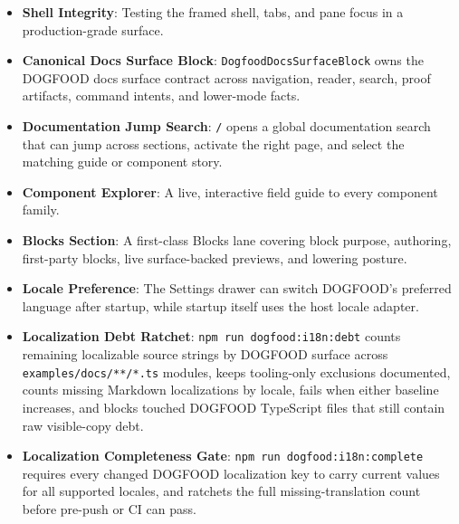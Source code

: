 \begin{itemize}
\tightlist
\item
  \textbf{Shell Integrity}: Testing the framed shell, tabs, and pane focus in a production-grade surface.
\item
  \textbf{Canonical Docs Surface Block}: \texttt{D\allowbreak{}o\allowbreak{}g\allowbreak{}f\allowbreak{}o\allowbreak{}o\allowbreak{}d\allowbreak{}D\allowbreak{}o\allowbreak{}c\allowbreak{}s\allowbreak{}S\allowbreak{}u\allowbreak{}r\allowbreak{}f\allowbreak{}a\allowbreak{}c\allowbreak{}e\allowbreak{}B\allowbreak{}l\allowbreak{}o\allowbreak{}c\allowbreak{}k} owns the DOGFOOD docs surface contract across navigation, reader, search, proof artifacts, command intents, and lower-mode facts.
\item
  \textbf{Documentation Jump Search}: \texttt{/} opens a global documentation search that can jump across sections, activate the right page, and select the matching guide or component story.
\item
  \textbf{Component Explorer}: A live, interactive field guide to every component family.
\item
  \textbf{Blocks Section}: A first-class Blocks lane covering block purpose, authoring, first-party blocks, live surface-backed previews, and lowering posture.
\item
  \textbf{Locale Preference}: The Settings drawer can switch DOGFOOD's preferred language after startup, while startup itself uses the host locale adapter.
\item
  \textbf{Localization Debt Ratchet}: \texttt{n\allowbreak{}p\allowbreak{}m\allowbreak{} \allowbreak{}r\allowbreak{}u\allowbreak{}n\allowbreak{} \allowbreak{}d\allowbreak{}o\allowbreak{}g\allowbreak{}f\allowbreak{}o\allowbreak{}o\allowbreak{}d\allowbreak{}:\allowbreak{}i\allowbreak{}1\allowbreak{}8\allowbreak{}n\allowbreak{}:\allowbreak{}d\allowbreak{}e\allowbreak{}b\allowbreak{}t} counts remaining localizable source strings by DOGFOOD surface across \texttt{e\allowbreak{}x\allowbreak{}a\allowbreak{}m\allowbreak{}p\allowbreak{}l\allowbreak{}e\allowbreak{}s\allowbreak{}/\allowbreak{}d\allowbreak{}o\allowbreak{}c\allowbreak{}s\allowbreak{}/\allowbreak{}*\allowbreak{}*\allowbreak{}/\allowbreak{}*\allowbreak{}.\allowbreak{}t\allowbreak{}s} modules, keeps tooling-only exclusions documented, counts missing Markdown localizations by locale, fails when either baseline increases, and blocks touched DOGFOOD TypeScript files that still contain raw visible-copy debt.
\item
  \textbf{Localization Completeness Gate}: \texttt{n\allowbreak{}p\allowbreak{}m\allowbreak{} \allowbreak{}r\allowbreak{}u\allowbreak{}n\allowbreak{} \allowbreak{}d\allowbreak{}o\allowbreak{}g\allowbreak{}f\allowbreak{}o\allowbreak{}o\allowbreak{}d\allowbreak{}:\allowbreak{}i\allowbreak{}1\allowbreak{}8\allowbreak{}n\allowbreak{}:\allowbreak{}c\allowbreak{}o\allowbreak{}m\allowbreak{}p\allowbreak{}l\allowbreak{}e\allowbreak{}t\allowbreak{}e} requires every changed DOGFOOD localization key to carry current values for all supported locales, and ratchets the full missing-translation count before pre-push or CI can pass.

\end{itemize}
